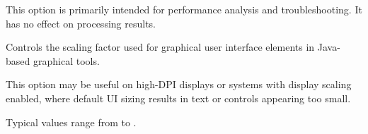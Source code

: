 \begin{description}[style=nextline]
This option is primarily intended for performance analysis and troubleshooting.
It has no effect on processing results.

\item[{\file-J-Dsun.java2d.uiScale=SCALE}] 

Controls the scaling factor used for graphical user interface elements in
Java-based graphical tools.

This option may be useful on high-DPI displays or systems with display scaling
enabled, where default UI sizing results in text or controls appearing too
small.

Typical values range from {} to {}.

\end{description}


